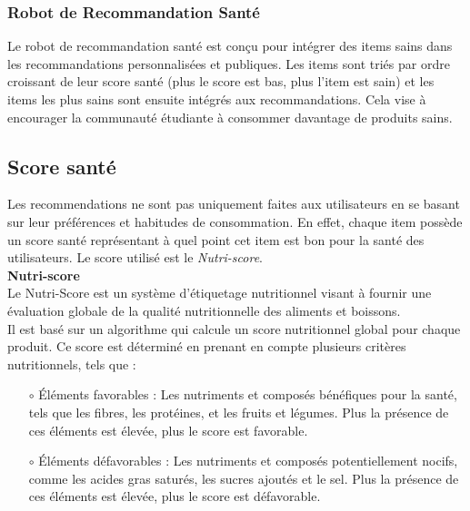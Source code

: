 \documentclass[11pt]{article}
\begin{document}
\subsubsection{Robot de Recommandation Santé}
Le robot de recommandation santé est conçu pour intégrer des items sains dans les recommandations personnalisées et publiques. Les items sont triés par ordre croissant de leur score santé (plus le score est bas, plus l'item est sain) et les items les plus sains sont ensuite intégrés aux recommandations. Cela vise à encourager la communauté étudiante à consommer davantage de produits sains.

\subsection{Score santé}
Les recommendations ne sont pas uniquement faites aux utilisateurs en se basant sur leur préférences et habitudes de consommation. En effet, chaque item possède un score santé représentant à quel point cet item est bon pour la santé des utilisateurs. Le score utilisé est le \textit{Nutri-score}.\\

\textbf{Nutri-score}\\

Le Nutri-Score est un système d'étiquetage nutritionnel visant à fournir une évaluation globale de la qualité nutritionnelle des aliments et boissons.\\

Il est basé sur un algorithme qui calcule un score nutritionnel global pour chaque produit. Ce score est déterminé en prenant en compte plusieurs critères nutritionnels, tels que :\\

\begin{itemize}
    \item[$\circ$] Éléments favorables : Les nutriments et composés bénéfiques pour la santé, tels que les fibres, les protéines, et les fruits et légumes. Plus la présence de ces éléments est élevée, plus le score est favorable.\\
    
    \item[$\circ$] Éléments défavorables : Les nutriments et composés potentiellement nocifs, comme les acides gras saturés, les sucres ajoutés et le sel. Plus la présence de ces éléments est élevée, plus le score est défavorable.\\
\end{itemize}
\end{document}

